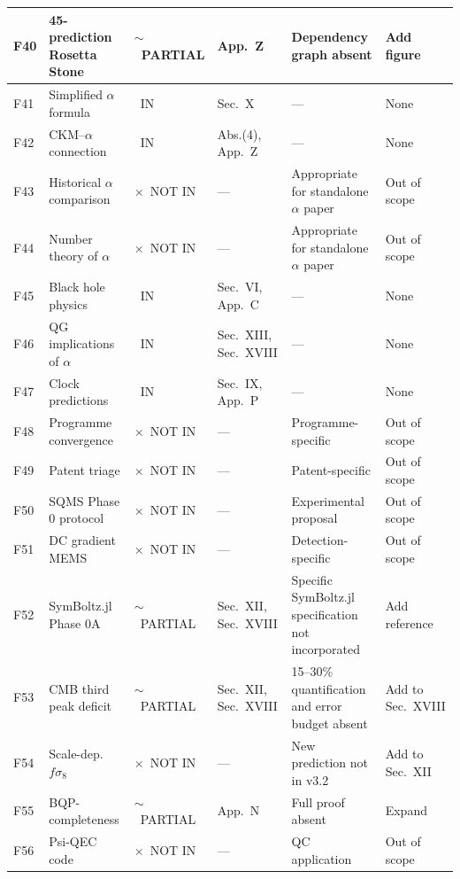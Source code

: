 \documentclass[11pt,a4paper]{article}
\newcommand{\vin}{\textcolor{statusIN}{\checkmark~IN}}
\newcommand{\vpartial}{\textcolor{statusPARTIAL}{$\sim$~PARTIAL}}
\newcommand{\vnot}{\textcolor{statusNOT}{$\times$~NOT IN}}
\begin{document}
{\begin{longtable}{|p{0.5cm}|p{4.8cm}|p{1.6cm}|p{2.5cm}|p{4.5cm}|p{1.8cm}|}
\rowcolor{technical!8}
F40 & 45-prediction Rosetta Stone & \vpartial & App.~Z & Dependency graph absent & Add figure \\
\hline
\rowcolor{technical!8}
F41 & Simplified $\alpha$ formula & \vin & Sec.~X & --- & None \\
\hline
\rowcolor{technical!8}
F42 & CKM--$\alpha$ connection & \vin & Abs.(4), App.~Z & --- & None \\
\hline
\rowcolor{technical!8}
F43 & Historical $\alpha$ comparison & \vnot & --- & Appropriate for standalone $\alpha$ paper & Out of scope \\
\hline
\rowcolor{technical!8}
F44 & Number theory of $\alpha$ & \vnot & --- & Appropriate for standalone $\alpha$ paper & Out of scope \\
\hline
\rowcolor{technical!8}
F45 & Black hole physics & \vin & Sec.~VI, App.~C & --- & None \\
\hline
\rowcolor{technical!8}
F46 & QG implications of $\alpha$ & \vin & Sec.~XIII, Sec.~XVIII & --- & None \\
\hline
\rowcolor{technical!8}
F47 & Clock predictions & \vin & Sec.~IX, App.~P & --- & None \\
\hline
\rowcolor{technical!8}
F48 & Programme convergence & \vnot & --- & Programme-specific & Out of scope \\
\hline
\rowcolor{technical!8}
F49 & Patent triage & \vnot & --- & Patent-specific & Out of scope \\
\hline
\rowcolor{technical!8}
F50 & SQMS Phase 0 protocol & \vnot & --- & Experimental proposal & Out of scope \\
\hline
\rowcolor{technical!8}
F51 & DC gradient MEMS & \vnot & --- & Detection-specific & Out of scope \\
\hline
\rowcolor{technical!8}
F52 & SymBoltz.jl Phase 0A & \vpartial & Sec.~XII, Sec.~XVIII & Specific SymBoltz.jl specification not incorporated & Add reference \\
\hline
\rowcolor{technical!8}
F53 & CMB third peak deficit & \vpartial & Sec.~XII, Sec.~XVIII & 15--30\% quantification and error budget absent & Add to Sec.~XVIII \\
\hline
\rowcolor{technical!8}
F54 & Scale-dep.\ $f\sigma_8$ & \vnot & --- & New prediction not in v3.2 & Add to Sec.~XII \\
\hline
\rowcolor{technical!8}
F55 & BQP-completeness & \vpartial & App.~N & Full proof absent & Expand \\
\hline
\rowcolor{technical!8}
F56 & Psi-QEC code & \vnot & --- & QC application & Out of scope \\

\end{longtable}}
\end{document}
